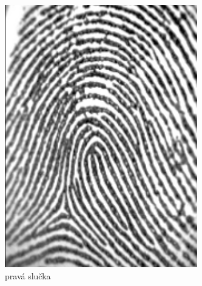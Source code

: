 \begin{figure}[h]
\begin{subfigure}[b]{0.19\linewidth}
      \includegraphics[width=\linewidth]{obrazky-figures/prava_slucka.png}
      \caption{pravá slučka}
      \label{obr:triedy_odtlackov/prava_slucka}
    \end{subfigure}
    \hfill
    \begin{subfigure}[b]{0.19\linewidth}

\end{subfigure}
\end{figure}
